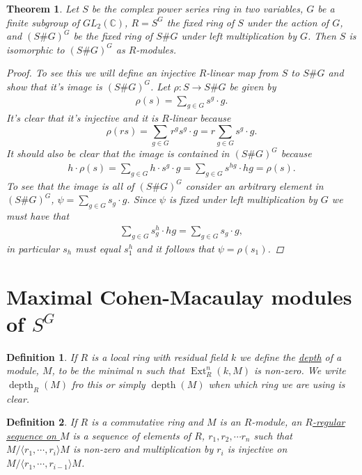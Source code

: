\documentclass[11pt, a4paper, english]{article}
\numberwithin{prop}{section}
\numberwithin{lemma}{section}
\newtheorem{theorem}{Theorem}
\numberwithin{theorem}{section}
\newtheorem{defin}{Definition}
\numberwithin{defin}{section}
\numberwithin{example}{section}
\newcommand{\C}{\mathbb{C}}
\DeclareMathOperator{\Ext}{Ext}
\DeclareMathOperator{\depth}{depth}
\begin{document}
\begin{theorem}
Let $S$ be the complex power series ring in two variables, $G$ be a finite subgroup of $GL_2(\C)$, $R = S^G$ the fixed ring of $S$ under the action of $G$, and $(S\#G)^G$ be the fixed ring of $S\#G$ under left multiplication by $G$. Then $S$ is isomorphic to $(S\#G)^G$ as $R$-modules.

\begin{proof}
To see this we will define an injective $R$-linear map from $S$ to $S\#G$ and show that it's image is $(S\#G)^G$. Let $\rho: S \to S\#G$ be given by
\begin{align*}
\rho(s) = \sum_{g \in G} s^g \cdot g.
\end{align*}
It's clear that it's injective and it is $R$-linear because $$\rho(rs) = \sum_{g \in G} r^gs^g \cdot g = r\sum_{g \in G} s^g \cdot g.$$ It should also be clear that the image is contained in $(S\#G)^G$ because
\begin{align*}
h \cdot \rho(s) = \sum_{g \in G} h \cdot s^g \cdot g = \sum_{g \in G} s^{hg} \cdot hg = \rho(s).
\end{align*}
To see that the image is all of $(S\#G)^G$ consider an arbitrary element in $(S\#G)^G$, $\psi = \sum_{g\in G} s_g \cdot g$. Since $\psi$ is fixed under left multiplication by $G$ we must have that
\begin{align*}
\sum_{g\in G} s_g^h \cdot hg = \sum_{g\in G} s_g \cdot g,
\end{align*}
in particular $s_h$ must equal $s_1^h$ and it follows that $\psi = \rho(s_1)$.
\end{proof}
\end{theorem}

\section{Maximal Cohen-Macaulay modules of $S^G$}
\begin{defin}
If $R$ is a local ring with residual field $k$ we define the \underline{depth} of a module, $M$, to be the minimal $n$ such that $\Ext^n_R(k, M)$ is non-zero. We write $\depth_R(M)$ fro this or simply $\depth(M)$ when which ring we are using is clear.
\end{defin}

\begin{defin}
\label{def:regular_seq}
If $R$ is a commutative ring and $M$ is an $R$-module, an \underline{$R$-regular sequence on $M$} is a sequence of elements of $R$, $r_1, r_2, \cdots r_n$ such that $M/\langle r_1, \cdots, r_i \rangle M$ is non-zero and multiplication by $r_i$ is injective on $M/\langle r_1, \cdots, r_{i-1} \rangle M$.
\end{defin}
\end{document}
